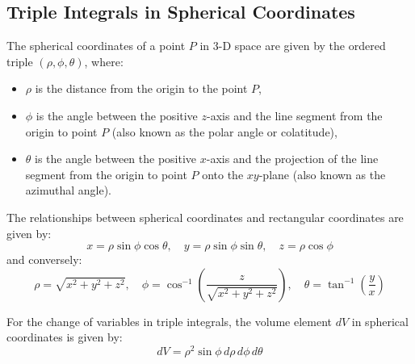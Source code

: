 \documentclass[11pt]{report}
\begin{document}
\subsection{Triple Integrals in Spherical Coordinates}
\begin{definition}
    The spherical coordinates of a point $P$ in 3-D space are given by the ordered triple $(\rho, \phi, \theta)$, where:
    \begin{itemize}
        \item $\rho$ is the distance from the origin to the point $P$,
        \item $\phi$ is the angle between the positive $z$-axis and the line segment from the origin to point $P$ (also known as the polar angle or colatitude),
        \item $\theta$ is the angle between the positive $x$-axis and the projection of the line segment from the origin to point $P$ onto the $xy$-plane (also known as the azimuthal angle).
    \end{itemize}
    The relationships between spherical coordinates and rectangular coordinates are given by:
    \begin{equation}
        x = \rho \sin \phi \cos \theta, \quad y = \rho \sin \phi \sin \theta, \quad z = \rho \cos \phi
    \end{equation}
    and conversely:
    \begin{equation}
        \rho = \sqrt{x^2 + y^2 + z^2}, \quad \phi = \cos^{-1}\left(\frac{z}{\sqrt{x^2 + y^2 + z^2}}\right), \quad \theta = \tan^{-1}\left(\frac{y}{x}\right)
    \end{equation}

    For the change of variables in triple integrals, the volume element $dV$ in spherical coordinates is given by:
    \begin{equation}
        dV = \rho^2 \sin \phi \, d\rho \, d\phi \, d\theta
    \end{equation}
\end{definition}
\end{document}
